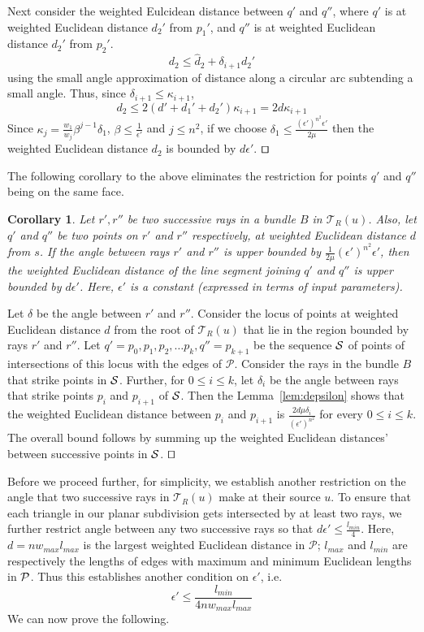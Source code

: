 \documentclass[11pt]{article}
\def\qed{\hbox{\rlap{$\sqcap$}$\sqcup$}}
\def\calP{\mathcal{P}}
\def\calT{\mathcal{T}}
\newtheorem{cor}{Corollary}
\newenvironment{proof}{\par\noindent{\bf Proof:}}{\mbox{}\hfill$\qed$\\}
\begin{document}
\begin{proof}
Next consider the weighted Eulcidean distance between $q'$ and $q''$, where $q'$ is at weighted Euclidean distance $d_2'$ from $p_1'$, and $q''$ is at weighted Euclidean distance $d_2'$ from $p_2'$.
\[ d_2 \leq \hat{d}_2 + \delta_{i+1}d_2' \]
using the small angle approximation of distance along a circular arc subtending a small angle.
Thus, since $\delta_{i+1} \leq \kappa_{i+1} $,
\[ d_2 \leq  2(d'+  d_1'+ d_2') \kappa_{i+1}  = 2d\kappa_{i+1}\]
Since $\kappa_j =  \frac{w_1}{w_j} \beta^{j-1} \delta_1$, $\beta \leq \frac{1}{\epsilon'}$ and $j \leq n^2$, if we choose $\delta_1 \leq \frac{(\epsilon')^{n^2}\epsilon'}{2\mu}$ then the weighted Euclidean distance $d_2$ is bounded by $ d\epsilon'$.
\end{proof}

The following corollary to the above eliminates the restriction for points $q'$ and $q''$ being on the same face.
\begin{cor}
\label{lem:depsilonC}
Let $r', r''$ be two successive rays in a bundle $B$ in $\calT_R(u)$.
Also, let $q'$ and $q''$ be two points on $r'$ and $r''$ respectively, at weighted Euclidean distance $d$ from $s$.
If the angle between rays $r'$ and $r''$ is upper bounded by $\frac{1}{2\mu}(\epsilon')^{n^2}\epsilon'$, then the weighted Euclidean distance of the line segment joining $q'$ and $q''$ is upper bounded by $d \epsilon'$. 
Here, $\epsilon'$ is a constant (expressed in terms of input parameters).
\end{cor}
\begin{proof}
Let $\delta$ be the angle between $r'$ and $r''$.
Consider the locus of points at weighted Euclidean distance $d$ from the root of $\calT_R(u)$ that lie in the region bounded by rays $r'$ and $r''$.
Let $q'=p_0, p_1, p_2, \ldots p_k, q''=p_{k+1}$ be the sequence $\cal{S}$ of points of intersections of this locus with the edges of $\calP$.
Consider the rays in the bundle $B$ that strike points in $\cal{S}$.
Further, for $0 \le i \le k$, let $\delta_i$ be the angle between rays that strike points $p_i$ and $p_{i+1}$ of $\cal{S}$. 
Then the Lemma~\ref{lem:depsilon} shows that the weighted Euclidean distance between $p_i$ and $p_{i+1}$ is $\frac{2d\mu\delta_i}{(\epsilon')^{n^2}}$ for every $0 \le i \le k$.
The overall bound follows by summing up the weighted Euclidean distances' between successive points in $\cal{S}$.
\end{proof}

Before we proceed further, for simplicity, we establish another restriction on the angle that two successive rays in $\calT_R(u)$ make at their source $u$. To ensure that each triangle in our planar subdivision gets intersected by at least two rays, we further restrict angle between any two successive rays so that $d \epsilon' \leq \frac{l_{min}}{4}$.
Here, $d= nw_{max}l_{max}$ is the largest weighted Euclidean distance in $\calP$; $l_{max}$ and $l_{min}$ are respectively the lengths of edges with maximum and minimum Euclidean lengths in ${\cal P}$.
Thus this establishes another condition on $\epsilon'$, i.e.
\begin{equation}
\epsilon' \leq  \frac{l_{min}}{4n w_{max} l_{max}}  \label{eqnepsilon}
\end{equation}
We can now prove the following.
\end{document}
